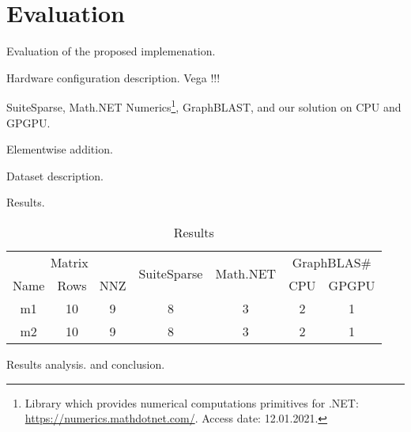 \section{Evaluation}

Evaluation of the proposed implemenation.

Hardware configuration description. Vega !!!

SuiteSparse, Math.NET Numerics\footnote{Library which provides numerical computations primitives for .NET: \url{https://numerics.mathdotnet.com/}. Access date: 12.01.2021.}, GraphBLAST, and our solution on CPU and GPGPU.

Elementwise addition. 

Dataset description.

Results.

\begin{table}
\caption{Results}
\label{tbl_results}
\begin{center}
\begin{tabular}{|c|c|c|c|c|c|c|}
\hline
\multicolumn{3}{|c|}{Matrix} & \multirow{2}{5em}{SuiteSparse} & \multirow{2}{4em}{Math.NET} & \multicolumn{2}{|c|}{GraphBLAS\#} \\
Name & Rows & NNZ            &                                &                             & CPU & GPGPU \\ 
\hline
\hline
m1     & 10          & 9        & 8     & 3& 2 & 1      \\ 
m2     & 10          & 9        & 8     & 3& 2 & 1      \\ 
\hline
\end{tabular}
\end{center}
\end{table}

Results analysis. and conclusion.

